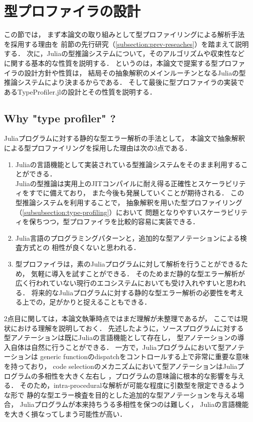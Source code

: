 
\section{型プロファイラの設計} \label{section:3}

この節では，
まず本論文の取り組みとして型プロファイリングによる解析手法を採用する理由を
前節の先行研究（\ref{subsection:prev-reseaches}）を踏まえて説明する．
次に，Juliaの型推論システムについて，そのアルゴリズムや収束性などに関する基本的な性質を説明する．
というのは，本論文で提案する型プロファイラの設計方針や性質は，
結局その抽象解釈のメインルーチンとなるJuliaの型推論システムにより決まるからである．
そして最後に型プロファイラの実装であるTypeProfiler.jlの設計とその性質を説明する．

\subsection{Why "type profiler" ?}

Juliaプログラムに対する静的な型エラー解析の手法として，
本論文で抽象解釈による型プロファイリングを採用した理由は次の3点である．

\begin{enumerate}
  \item Juliaの言語機能として実装されている型推論システムをそのまま利用することができる．\\
        Juliaの型推論は実用上のJITコンパイルに耐え得る正確性とスケーラビリティをすでに備えており，
        また今後も発展していくことが期待される．
        この型推論システムを利用することで，
        抽象解釈を用いた型プロファイリング（\ref{subsubsection:type-profiling}）において
        問題となりやすいスケーラビリティを保ちつつ，型プロファイラを比較的容易に実装できる．
　\item Julia言語のプログラミングパターンと，追加的な型アノテーションによる検査方式との
        相性が良くないと思われる．
  \item 型プロファイラは，素のJuliaプログラムに対して解析を行うことができるため，
        気軽に導入を試すことができる．
        そのためまだ静的な型エラー解析が広く行われていない現行のエコシステムにおいても受け入れやすいと思われる．
        将来的なJuliaプログラムに対する静的な型エラー解析の必要性を考える上での，足がかりと捉えることもできる．
\end{enumerate}

2点目に関しては，本論文執筆時点ではまだ理解が未整理であるが，
ここでは現状における理解を説明しておく．
先述したように，ソースプログラムに対する型アノテーションは既にJuliaの言語機能として存在し，
型アノテーションの導入自体は自然に行うことができる．
一方で，Juliaプログラムにおいて型アノテーションは
generic functionのdispatchをコントロールする上で非常に重要な意味を持っており，
code selectionのメカニズムにおいて型アノテーションはJuliaプログラムの多相性を大きく左右し\footnotemark
，プログラムの意味論に根本的な影響を与える．
そのため，intra-proceduralな解析が可能な程度に引数型を限定できるような形で
静的な型エラー検査を目的とした追加的な型アノテーションを与える場合，
Juliaプログラムが本来持ちうる多相性を保つのは難しく，
Juliaの言語機能を大きく損なってしまう可能性が高い．


